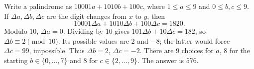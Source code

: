 Write a palindrome as $10001a+1010b+100c$, where $1\le a\le9$ and $0\le b,c\le9$. If $\Delta a,\Delta b,\Delta c$ are the digit changes from $x$ to $y$, then
\[10001\Delta a+1010\Delta b+100\Delta c=1820.\]
Modulo $10$, $\Delta a=0$. Dividing by $10$ gives $101\Delta b+10\Delta c=182$, so $\Delta b\equiv2\pmod{10}$. Its possible values are $2$ and $-8$; the latter would force $\Delta c=99$, impossible. Thus $\Delta b=2$, $\Delta c=-2$. There are $9$ choices for $a$, $8$ for the starting $b\in\{0,\ldots,7\}$ and $8$ for $c\in\{2,\ldots,9\}$. The answer is $\boxed{576}$.
